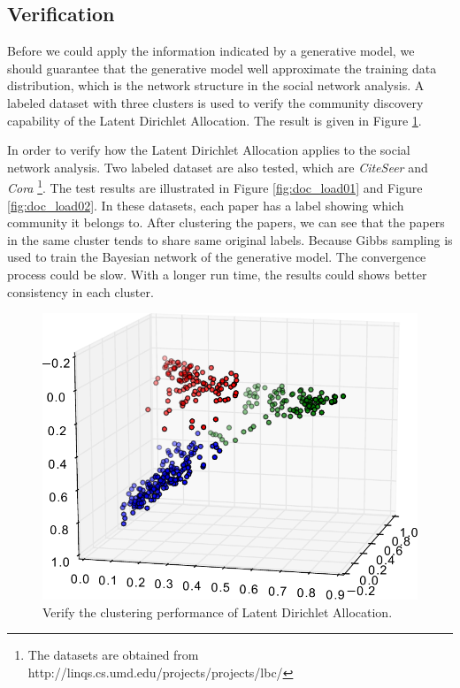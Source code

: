 \documentclass[letterpaper]{article}
\begin{document}
\subsection{Verification}

Before we could apply the information indicated by a generative model, we should guarantee that the generative model well approximate the training data distribution, which is the network structure in the social network analysis.
A labeled dataset with three clusters is used to verify the community discovery capability of the Latent Dirichlet Allocation.
The result is given in Figure \ref{fig:cluster3}.

In order to verify how the Latent Dirichlet Allocation applies to the social network analysis.
Two labeled dataset are also tested, which are \emph{CiteSeer} and \emph{Cora}
\footnote{The datasets are obtained from http://linqs.cs.umd.edu/projects/projects/lbc/}.
The test results are illustrated in Figure \ref{fig:doc_load01} and Figure \ref{fig:doc_load02}.
In these datasets, each paper has a label showing which community it belongs to.
After clustering the papers, we can see that the papers in the same cluster tends to share same original labels.
Because Gibbs sampling is used to train the Bayesian network of the generative model.
The convergence process could be slow.
With a longer run time, the results could shows better consistency in each cluster.

\begin{figure}[ht]
\centering
\includegraphics[width=0.8\linewidth]{./fig/cluster3}
\caption{Verify the clustering performance of Latent Dirichlet Allocation.}
\label{fig:cluster3}
\end{figure}
\end{document}
